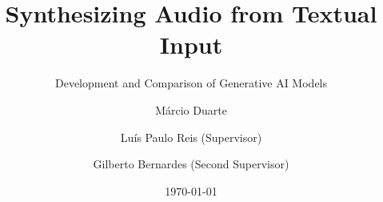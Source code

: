 \title{Synthesizing Audio from Textual Input}
\subtitle{Development and Comparison of Generative AI Models}
\author{Márcio Duarte \\
    \and Luís Paulo Reis (Supervisor) \\
    \and Gilberto Bernardes (Second Supervisor)
}
\date{\today}